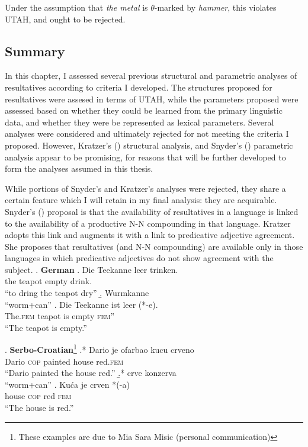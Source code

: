\documentclass[MilwayThesis]{subfiles}
\begin{document}
Under the assumption that \textit{the metal} is $\theta$-marked by \textit{hammer}, this violates UTAH, and ought to be rejected.

\subsection{Summary}
In this chapter, I assessed several previous structural and parametric analyses of resultatives according to criteria I developed.
The structures proposed for resultatives were assesed in terms of UTAH, while the parameters proposed were assessed based on whether they could be learned from the primary linguistic data, and whether they were be represented as lexical parameters.
Several analyses were considered and ultimately rejected for not meeting the criteria I proposed.
However, Kratzer's (\citeyear{kratzer2004building}) structural analysis, and Snyder's (\citeyear{snyder1995language,snyder2012parameter}) parametric analysis appear to be promising, for reasons that will be further developed to form the analyses assumed in this thesis.

While portions of Snyder's and Kratzer's analyses were rejected, they share a certain feature which I will retain in my final analysis: they are acquirable.
Snyder's (\citeyear{snyder1995language}) proposal is that the availability of resultatives in a language is linked to the availability of a productive N-N compounding in that language.
Kratzer adopts this link and augments it with a link to predicative adjective agreement.
She proposes that resultatives (and N-N compounding) are available only in those languages in which predicative adjectives do not show agreement with the subject.
\ex. \textbf{German}
\ag. Die Teekanne leer trinken.\\
the teapot empty drink.\\
``to dring the teapot dry'' \parencite{kratzer2004building}
\b. Wurmkanne\\
``worm+can'' \parencite{snyder2001nature}
\cg. Die Teekanne ist leer (*-e).\\
The.\textsc{fem} teapot is empty \textsc{fem}''\\
``The teapot is empty.''

\ex. \textbf{Serbo-Croatian}\footnote{These examples are due to Mia Sara Misic (personal communication)} 
\ag.* Dario je ofarbao kucu crveno\\
Dario \textsc{cop} painted house red.\textsc{fem}\\
``Dario painted the house red.''
\b.* crve konzerva\\
``worm+can''
\cg. Ku\'ca je crven *(-a)\\
house \textsc{cop} red \textsc{fem}\\
``The house is red.''
\end{document}
